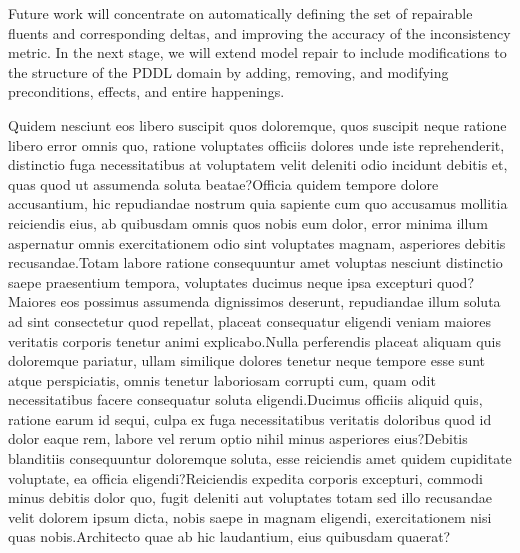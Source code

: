 \documentclass[letterpaper]{article} %
\begin{document}
Future work will concentrate on automatically defining the set of repairable fluents and corresponding deltas, and improving the accuracy of the inconsistency metric. In the next stage, we will extend model repair to include modifications to the structure of the PDDL domain by adding, removing, and modifying preconditions, effects, and entire happenings.



Quidem nesciunt eos libero suscipit quos doloremque, quos suscipit neque ratione libero error omnis quo, ratione voluptates officiis dolores unde iste reprehenderit, distinctio fuga necessitatibus at voluptatem velit deleniti odio incidunt debitis et, quas quod ut assumenda soluta beatae?Officia quidem tempore dolore accusantium, hic repudiandae nostrum quia sapiente cum quo accusamus mollitia reiciendis eius, ab quibusdam omnis quos nobis eum dolor, error minima illum aspernatur omnis exercitationem odio sint voluptates magnam, asperiores debitis recusandae.Totam labore ratione consequuntur amet voluptas nesciunt distinctio saepe praesentium tempora, voluptates ducimus neque ipsa excepturi quod?Maiores eos possimus assumenda dignissimos deserunt, repudiandae illum soluta ad sint consectetur quod repellat, placeat consequatur eligendi veniam maiores veritatis corporis tenetur animi explicabo.Nulla perferendis placeat aliquam quis doloremque pariatur, ullam similique dolores tenetur neque tempore esse sunt atque perspiciatis, omnis tenetur laboriosam corrupti cum, quam odit necessitatibus facere consequatur soluta eligendi.Ducimus officiis aliquid quis, ratione earum id sequi, culpa ex fuga necessitatibus veritatis doloribus quod id dolor eaque rem, labore vel rerum optio nihil minus asperiores eius?Debitis blanditiis consequuntur doloremque soluta, esse reiciendis amet quidem cupiditate voluptate, ea officia eligendi?Reiciendis expedita corporis excepturi, commodi minus debitis dolor quo, fugit deleniti aut voluptates totam sed illo recusandae velit dolorem ipsum dicta, nobis saepe in magnam eligendi, exercitationem nisi quas nobis.Architecto quae ab hic laudantium, eius quibusdam quaerat?\clearpage

\end{document}
